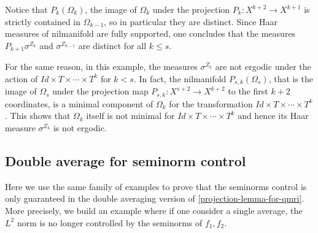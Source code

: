 \documentclass[letter, 11pt]{article}
\theoremstyle{definition}
\theoremstyle{plain}
\newcommand{\norm}[1]{\left\lVert#1\right\rVert}
\providecommand{\norm}[1]{\lVert #1\rVert}
\newcommand{\1}{\mathbbm{1}}
\newcommand{\E}{\operatorname{\mathbb{E}}}
\begin{document}
 Notice that $P_{k} ( \Omega_k)$, the image of $\Omega_k$ under the projection $P_{k} \colon X^{k+2} \to X^{k+1}$ is strictly contained in $\Omega_{k-1}$, so in particular they are distinct. Since Haar measures of nilmanifold are fully supported, one concludes that the measures $P_{k+1} \sigma^{Z_k}$ and $\sigma^{Z_{k-1}}$ are distinct for all $k \leq s$. 

 
 For the same reason, in this example, the measures $\sigma^{Z_k}$ are not ergodic under the action of $Id \times T \times \cdots \times T^k$ for $k <s$. In fact, the nilmanifold $P_{s,k}(\Omega_s)$, that is the image of $\Omega_s$ under the projection map $P_{s,k} \colon X ^{s+2} \to X^{k+2} $ to the first $k+2$ coordinates, is a minimal component of $\Omega_k$ for the transformation $Id \times T \times \cdots \times T^k$. This shows that $\Omega_k$ itself is not minimal for $Id \times T \times \cdots \times T^k$ and hence its Haar measure $\sigma^{Z_k}$ is not ergodic.  



\subsection{Double average for seminorm control} \label{subsec ex double average}

Here we use the same family of examples to prove that the seminorms control is only guaranteed in the double averaging version of \cref{projection-lemma-for-qmri}. More precisely, we build an example where if one consider a single average, the $L^2$ norm is no longer controlled by the seminorms of $f_1,f_2$.  
\end{document}
